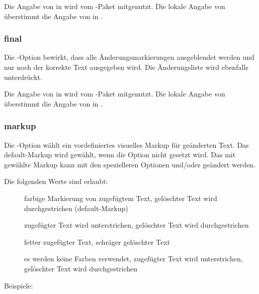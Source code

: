 Die Angabe von  in  wird vom -Paket mitgenutzt.
Die lokale Angabe von  überstimmt die Angabe von  in .


\subsubsection{final}

Die -Option bewirkt, dass alle Änderungsmarkierungen ausgeblendet werden und nur noch der korrekte Text ausgegeben wird.
Die Änderungsliste wird ebenfalls unterdrückt.

Die Angabe von  in  wird vom -Paket mitgenutzt.
Die lokale Angabe von  überstimmt die Angabe von  in .


\subsubsection{markup}

Die -Option wählt ein vordefiniertes visuelles Markup für geänderten Text.
Das default-Markup wird gewählt, wenn die Option nicht gesetzt wird.
Das mit  gewählte Markup kann mit den spezielleren Optionen  und/oder  geändert werden.

Die folgenden Werte sind erlaubt:
\begin{description}
	\item [] farbige Markierung von zugefügtem Text, gelöschter Text wird durchgestrichen (default-Markup)
	\item [] zugefügter Text wird unterstrichen, gelöschter Text wird durchgestrichen
	\item [] fetter zugefügter Text, schräger gelöschter Text
	\item [] es werden keine Farben verwendet, zugefügter Text wird unterstrichen, gelöschter Text wird durchgestrichen
\end{description}

Beispiele:

\\
\\
\\

